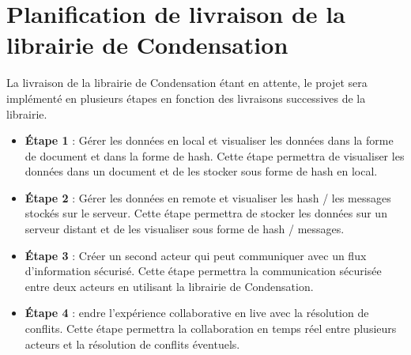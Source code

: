 \section*{Planification de livraison de la librairie de Condensation}
La livraison de la librairie de Condensation étant en attente, le projet sera implémenté en plusieurs étapes en fonction des livraisons successives de la librairie.
\begin{itemize}
    \item \textbf{Étape 1} : Gérer les données en local et visualiser les données dans la forme de document et dans la forme de hash. Cette étape permettra de visualiser les données dans un document et de les stocker sous forme de hash en local.
    \item \textbf{Étape 2} : Gérer les données en remote et visualiser les hash / les messages stockés sur le serveur. Cette étape permettra de stocker les données sur un serveur distant et de les visualiser sous forme de hash / messages.
    \item \textbf{Étape 3} : Créer un second acteur qui peut communiquer avec un flux d'information sécurisé. Cette étape permettra la communication sécurisée entre deux acteurs en utilisant la librairie de Condensation.
    \item \textbf{Étape 4} : endre l'expérience collaborative en live avec la résolution de conflits. Cette étape permettra la collaboration en temps réel entre plusieurs acteurs et la résolution de conflits éventuels.
\end{itemize}